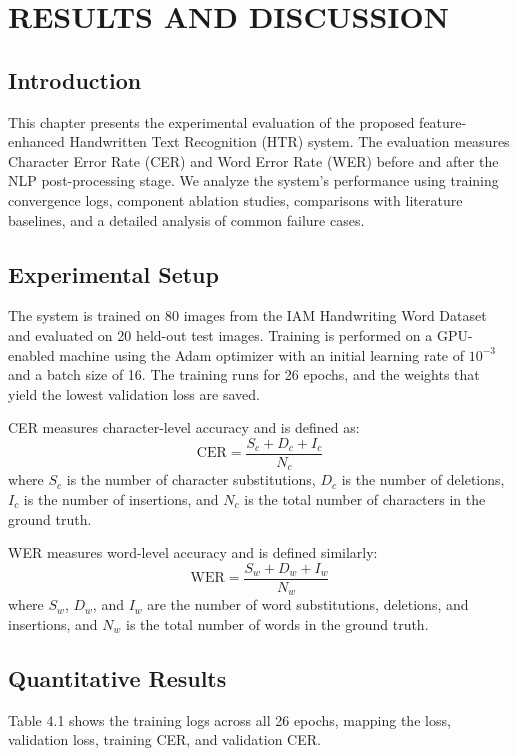 
\chapter{RESULTS AND DISCUSSION}
\label{ch:results}

\section{Introduction}
This chapter presents the experimental evaluation of the proposed feature-enhanced Handwritten Text Recognition (HTR) system. The evaluation measures Character Error Rate (CER) and Word Error Rate (WER) before and after the NLP post-processing stage. We analyze the system's performance using training convergence logs, component ablation studies, comparisons with literature baselines, and a detailed analysis of common failure cases.

\section{Experimental Setup}
The system is trained on 80 images from the IAM Handwriting Word Dataset and evaluated on 20 held-out test images. Training is performed on a GPU-enabled machine using the Adam optimizer with an initial learning rate of $10^{-3}$ and a batch size of 16. The training runs for 26 epochs, and the weights that yield the lowest validation loss are saved.

CER measures character-level accuracy and is defined as:
\begin{equation}
    \text{CER} = \frac{S_c + D_c + I_c}{N_c}
\end{equation}
where $S_c$ is the number of character substitutions, $D_c$ is the number of deletions, $I_c$ is the number of insertions, and $N_c$ is the total number of characters in the ground truth.

WER measures word-level accuracy and is defined similarly:
\begin{equation}
    \text{WER} = \frac{S_w + D_w + I_w}{N_w}
\end{equation}
where $S_w$, $D_w$, and $I_w$ are the number of word substitutions, deletions, and insertions, and $N_w$ is the total number of words in the ground truth.

\section{Quantitative Results}
Table 4.1 shows the training logs across all 26 epochs, mapping the loss, validation loss, training CER, and validation CER.

